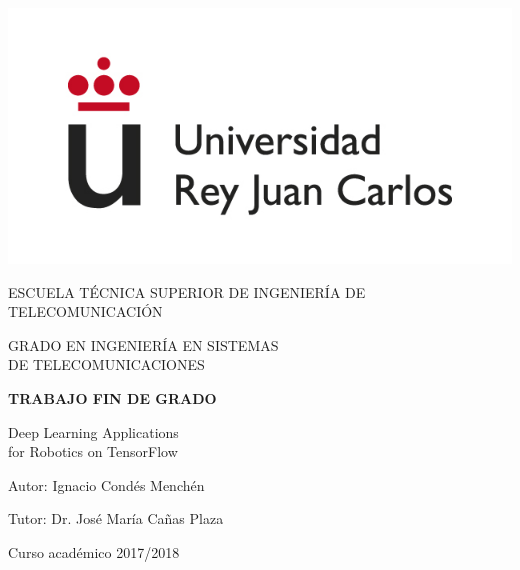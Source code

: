 \begin{titlepage}
	\begin{center}
		\vspace*{7.7mm}
		\includegraphics[width=0.4\linewidth]{images/logo}
		\vspace{6.5mm}
		
		\fontsize{15.5}{14}\selectfont ESCUELA TÉCNICA SUPERIOR DE INGENIERÍA DE TELECOMUNICACIÓN
		\vspace{13mm}
		
		\fontsize{14}{14}\selectfont GRADO EN INGENIERÍA EN SISTEMAS \\ DE TELECOMUNICACIONES
		
		\vspace{70pt}
		
		\fontsize{15.7}{14}\selectfont \textbf{TRABAJO FIN DE GRADO}
		
		\vspace{25mm}
		\begin{huge}
			Deep Learning Applications\\ for Robotics on TensorFlow \\
		\end{huge}
		
		\vspace{25mm}
		
		\begin{large}
			Autor: Ignacio Condés Menchén

			Tutor: Dr. José María Cañas Plaza
		\end{large}
		\begin{normalsize}
			
			Curso académico 2017/2018
		\end{normalsize}
		\vspace{10mm}
	\end{center}
\end{titlepage}

\pagebreak
\thispagestyle{empty}
\vspace*{18cm}

